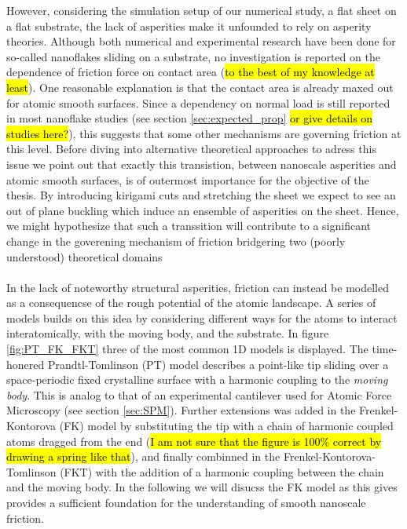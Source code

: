 However, considering the simulation setup of our numerical study, a flat sheet
on a flat substrate, the lack of asperities make it unfounded to rely on
asperity theories. Although both numerical and experimental research have been
done for so-called nanoflakes sliding on a substrate, no investigation is
reported on the dependence of friction force on contact area (\hl{to the best of
my knowledge at least}). One reasonable explanation is that the contact
area is already maxed out for atomic smooth surfaces. Since a dependency on
normal load is still reported in most nanoflake studies (see section
\cref{sec:expected_prop} \hl{or give details on studies here?}), this suggests
that some other mechanisms are governing friction at this level. Before diving
into alternative theoretical approaches to adress this issue we point out that exactly this transistion, between nanoscale asperities and atomic smooth surfaces, is of outermost importance for the objective of the thesis. By introducing kirigami cuts and stretching the sheet we expect to see an out of plane buckling which induce an ensemble of asperities on the sheet. Hence, we might hypothesize that such a transsition will contribute to a significant change in the goverening mechanism of friction bridgering two (poorly understood) theoretical domains 
\\
\\
In the lack of noteworthy structural asperities, friction can instead be
modelled as a consequencse of the rough potential of the atomic landscape. A
series of models builds on this idea by considering different ways for the atoms
to interact interatomically, with the moving body, and the substrate. In figure
\cref{fig:PT_FK_FKT} three of the most common 1D models is displayed. The
time-honered Prandtl-Tomlinson (PT) model describes a point-like tip sliding
over a space-periodic fixed crystalline surface with a harmonic coupling to the
\textit{moving body}. This is analog to that of an experimental cantilever used
for Atomic Force Microscopy (see section \cref{sec:SPM}). Further extensions was
added in the Frenkel-Kontorova (FK) model by substituting the tip with a chain
of harmonic coupled atoms dragged from the end (\hl{I am not sure that the
figure is 100\% correct by drawing a spring like that}), and finally combinned
in the Frenkel-Kontorova-Tomlinson (FKT) with the addition of a harmonic
coupling between the chain and the moving body. In the following we will disucss the FK model as this gives provides a sufficient foundation for the understanding of smooth nanoscale friction.

